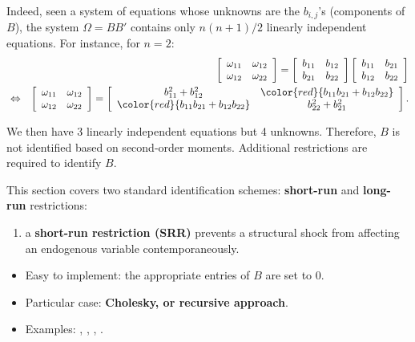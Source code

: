 \documentclass[
  12pt,
]{book}
\providecommand{\tightlist}{%
  \setlength{\itemsep}{0pt}\setlength{\parskip}{0pt}}
\theoremstyle{definition}
\theoremstyle{definition}
\theoremstyle{definition}
\theoremstyle{definition}
\theoremstyle{remark}
\begin{document}
Indeed, seen a system of equations whose unknowns are the \(b_{i,j}\)'s (components of \(B\)), the system \(\Omega = BB'\) contains only \(n(n+1)/2\) linearly independent equations. For instance, for \(n=2\):
\begin{eqnarray*}
&&\left[
\begin{array}{cc}
\omega_{11} & \omega_{12} \\
\omega_{12} & \omega_{22}
\end{array}
\right] = \left[
\begin{array}{cc}
b_{11} & b_{12} \\
b_{21} & b_{22}
\end{array}
\right]\left[
\begin{array}{cc}
b_{11} & b_{21} \\
b_{12} & b_{22}
\end{array}
\right]\\
&\Leftrightarrow&\left[
\begin{array}{cc}
\omega_{11} & \omega_{12} \\
\omega_{12} & \omega_{22}
\end{array}
\right] = \left[
\begin{array}{cc}
b_{11}^2+b_{12}^2 & \color{red}{b_{11}b_{21}+b_{12}b_{22}} \\
\color{red}{b_{11}b_{21}+b_{12}b_{22}} & b_{22}^2 + b_{21}^2
\end{array}
\right].
\end{eqnarray*}

We then have 3 linearly independent equations but 4 unknowns. Therefore, \(B\) is not identified based on second-order moments. Additional restrictions are required to identify \(B\).

This section covers two standard identification schemes: \textbf{short-run} and \textbf{long-run} restrictions:

\begin{enumerate}
\def\labelenumi{\arabic{enumi}.}
\tightlist
\item
  a \textbf{short-run restriction (SRR)} prevents a structural shock from affecting an endogenous variable contemporaneously.
\end{enumerate}

\begin{itemize}
\tightlist
\item
  Easy to implement: the appropriate entries of \(B\) are set to 0.
\item
  Particular case: \textbf{Cholesky, or recursive approach}.
\item
  Examples: \citet{BERNANKE198649}, \citet{Sims_1986}, \citet{Gali_1992}, \citet{RubioRamirez_et_al_2010}.
\end{itemize}
\end{document}
